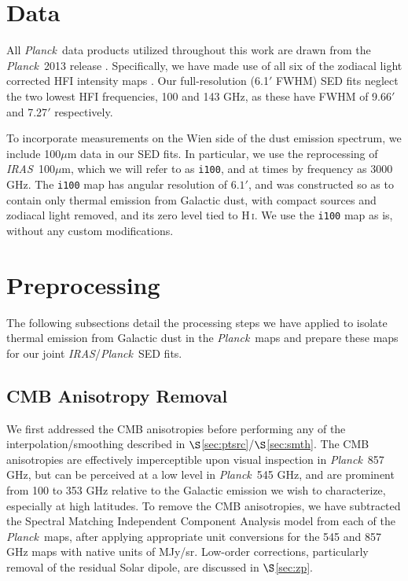 \documentclass{emulateapj}
\newcommand{\IRAS}{{\it IRAS}}
\newcommand{\PLANCK}{{\it Planck}}
\begin{document}
 \section{Data}
\label{sec:data}
All \PLANCK~data products utilized throughout this work are drawn from the 
\PLANCK~2013 release \citep{planck2013}. Specifically, we have made use 
of all six of the zodiacal light corrected HFI intensity maps
\citep[\texttt{R1.10\_nominal\_ZodiCorrected},][]{planckzodi}. Our 
full-resolution (6.1$'$ FWHM) SED fits neglect the two lowest HFI frequencies, 
100 and 143 GHz, as these have FWHM of 9.66$'$ and 7.27$'$ respectively.

To incorporate measurements on the Wien side of the dust emission spectrum, 
we include 100$\mu$m data in our SED fits. In particular, we use the 
\citet[henceforth SFD]{SFD} reprocessing of \IRAS~100$\mu$m, which we will 
refer to as \verb|i100|, and at times by frequency as 3000 GHz. The \verb|i100|
 map has angular resolution of $6.1'$, and was constructed so as to contain 
only thermal emission from Galactic dust, with compact sources and zodiacal 
light removed, and its zero level tied to H\,\textsc{i}. We use the \verb|i100|
map as is, without any custom modifications.


\section{Preprocessing}
\label{sec:prepro}

The following subsections detail the processing steps we have applied to 
isolate thermal emission from Galactic dust in the \PLANCK~maps and prepare
these maps for our joint \IRAS/\PLANCK~SED fits.

\subsection{CMB Anisotropy Removal}
\label{sec:cmb}
We first addressed the CMB anisotropies before performing any of the 
interpolation/smoothing described in $\S$\ref{sec:ptsrc}/$\S$\ref{sec:smth}. 
The CMB anisotropies are effectively imperceptible upon visual inspection 
in \PLANCK~857 GHz, but can be perceived at a low level in \PLANCK~545 GHz, and
are prominent from 100 to 353 GHz relative to the Galactic emission
we wish to characterize, especially at high latitudes. To remove the CMB 
anisotropies, we have subtracted the Spectral Matching Independent Component 
Analysis \citep[SMICA,][]{smica} model from each of the \PLANCK~maps, 
after applying appropriate unit conversions for the 545 and 857 GHz maps 
with native units of MJy/sr. Low-order corrections, particularly removal of the
residual Solar dipole, are discussed in $\S$\ref{sec:zp}.
\end{document}
